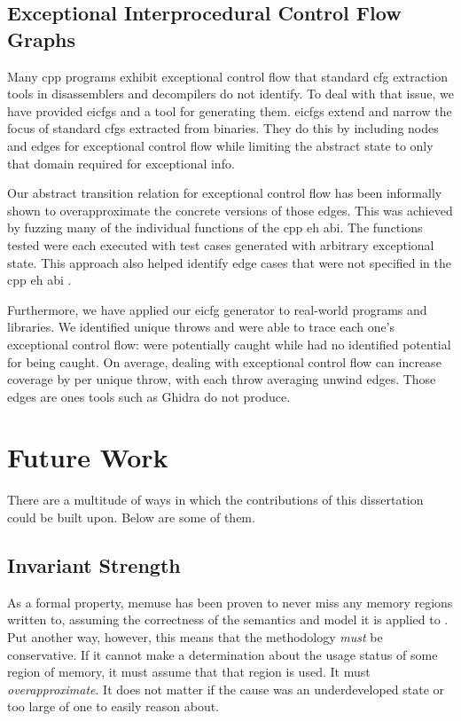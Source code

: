 \subsection{Exceptional Interprocedural Control Flow Graphs}
Many \gls{cpp} programs exhibit exceptional control flow that standard \gls{cfg} extraction tools in disassemblers and decompilers do not identify.
To deal with that issue, we have provided \glspl{eicfg} and a tool for generating them.
\Glspl{eicfg} extend and narrow the focus of standard \glspl{cfg} extracted from binaries.
They do this by including nodes and edges for exceptional control flow while limiting the abstract state to only that domain required for exceptional info.

Our abstract transition relation for exceptional control flow has been informally shown to overapproximate the concrete versions of those edges.
This was achieved by fuzzing many of the individual functions of the \gls{cpp} \gls{eh} \gls{abi}.
The functions tested were each executed with  test cases generated with arbitrary exceptional state.
This approach also helped identify edge cases that were not specified in the \gls{cpp} \gls{eh} \gls{abi} \cite{cxxEhAbi}.

Furthermore, we have applied our \gls{eicfg} generator to  real-world programs and libraries.
We identified  unique throws and were able to trace each one's exceptional control flow:  were potentially caught while  had no identified potential for being caught.
On average, dealing with exceptional control flow can increase coverage by  per unique throw, with each throw averaging  unwind edges.
Those edges are ones tools such as Ghidra do not produce.

\section{Future Work}
There are a multitude of ways in which the contributions of this dissertation could be built upon.
Below are some of them.

\subsection{Invariant Strength}
As a formal property, \gls{memuse} has been proven to never miss any memory regions written to, assuming the correctness of the semantics and model it is applied to \autocite{bockenek2019preservation,verbeek2022lifting}.
Put another way, however, this means that the methodology \emph{must} be conservative.
If it cannot make a determination about the usage status of some region of memory,
it must assume that that region is used. It must \emph{overapproximate}.%
It does not matter if the cause was an underdeveloped state or too large of one to easily reason about.

